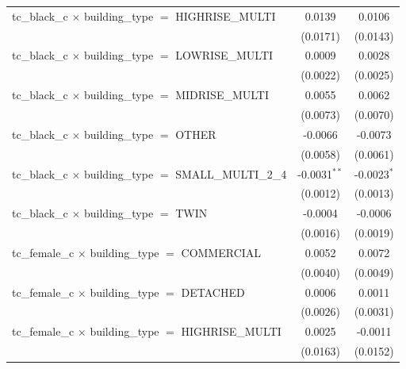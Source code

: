 \begin{tabular}{lcc}
   tc\_black\_c $\times$ building\_type $=$ HIGHRISE\_MULTI            & 0.0139                & 0.0106\\   
                                                                       & (0.0171)              & (0.0143)\\   
   tc\_black\_c $\times$ building\_type $=$ LOWRISE\_MULTI             & 0.0009                & 0.0028\\   
                                                                       & (0.0022)              & (0.0025)\\   
   tc\_black\_c $\times$ building\_type $=$ MIDRISE\_MULTI             & 0.0055                & 0.0062\\   
                                                                       & (0.0073)              & (0.0070)\\   
   tc\_black\_c $\times$ building\_type $=$ OTHER                      & -0.0066               & -0.0073\\   
                                                                       & (0.0058)              & (0.0061)\\   
   tc\_black\_c $\times$ building\_type $=$ SMALL\_MULTI\_2\_4         & -0.0031$^{**}$        & -0.0023$^{*}$\\   
                                                                       & (0.0012)              & (0.0013)\\   
   tc\_black\_c $\times$ building\_type $=$ TWIN                       & -0.0004               & -0.0006\\   
                                                                       & (0.0016)              & (0.0019)\\   
   tc\_female\_c $\times$ building\_type $=$ COMMERCIAL                & 0.0052                & 0.0072\\   
                                                                       & (0.0040)              & (0.0049)\\   
   tc\_female\_c $\times$ building\_type $=$ DETACHED                  & 0.0006                & 0.0011\\   
                                                                       & (0.0026)              & (0.0031)\\   
   tc\_female\_c $\times$ building\_type $=$ HIGHRISE\_MULTI           & 0.0025                & -0.0011\\   
                                                                       & (0.0163)              & (0.0152)\\   

\end{tabular}
